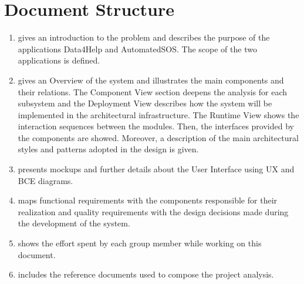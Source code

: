 \section{Document Structure}
\begin{enumerate} [label={Section \arabic*}]
    \item gives an introduction to the problem and describes the purpose of the applications Data4Help and AutomatedSOS. The scope of the two applications is defined.
    \item gives an Overview of the system and illustrates the main components and their relations. The Component View section deepens the analysis for each subsystem and the Deployment View describes how the system will be implemented in the architectural infrastructure. The Runtime View shows the interaction sequences between the modules. Then, the interfaces provided by the components are showed. Moreover, a description of the main architectural styles and patterns adopted in the design is given.
    \item presents mockups and further details about the User Interface using UX and BCE diagrams.
    \item maps functional requirements with the components responsible for their realization and quality requirements with the design decisions made during the development of the system.
    \item shows the effort spent by each group member while working on this document.
    \item includes the reference documents used to  compose the project analysis.
\end{enumerate}
